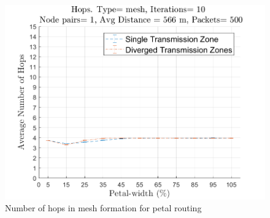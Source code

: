 \begin{figure}[hbtp]
\centering
\includegraphics[width=\simResultFigSize \textwidth]{ncsuthesis-0.6/Chapter-5/figs/pe_hops_mesh.png}
\caption{Number of hops in mesh formation for petal routing}
\label{fig:pe_hops_mesh}
\end{figure}

